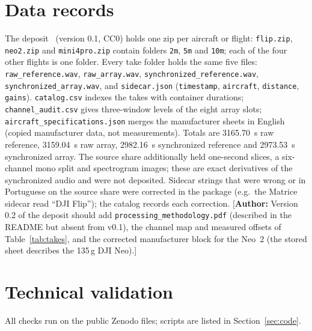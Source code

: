\documentclass[journal]{IEEEtran}
\newif\ifshowauthornotes\showauthornotestrue
\newcommand{\authornote}[1]{\ifshowauthornotes{\color{red!70!black}[\textbf{Author:} #1]}\fi}
\begin{document}
\section{Data records}\label{sec:records}
The deposit~\cite{ciodata} (version 0.1, CC0) holds one zip per aircraft or flight: \texttt{flip.zip}, \texttt{neo2.zip} and \texttt{mini4pro.zip} contain folders \texttt{2m}, \texttt{5m} and \texttt{10m}; each of the four other flights is one folder.
Every take folder holds the same five files: \texttt{raw\_reference.wav}, \texttt{raw\_array.wav}, \texttt{synchronized\_reference.wav}, \texttt{synchronized\_array.wav}, and \texttt{sidecar.json} (\texttt{timestamp}, \texttt{aircraft}, \texttt{distance}, \texttt{gains}).
\texttt{catalog.csv} indexes the takes with container durations; \texttt{channel\_audit.csv} gives three-window levels of the eight array slots; \texttt{aircraft\_specifications.json} merges the manufacturer sheets in English (copied manufacturer data, not measurements).
Totals are \SI{3165.70}{\second} raw reference, \SI{3159.04}{\second} raw array, \SI{2982.16}{\second} synchronized reference and \SI{2973.53}{\second} synchronized array.
The source share additionally held one-second slices, a six-channel mono split and spectrogram images; these are exact derivatives of the synchronized audio and were not deposited.
Sidecar strings that were wrong or in Portuguese on the source share were corrected in the package (e.g.\ the Matrice sidecar read ``DJI Flip''); the catalog records each correction.
\authornote{Version 0.2 of the deposit should add \texttt{processing\_methodology.pdf} (described in the README but absent from v0.1), the channel map and measured offsets of Table~\ref{tab:takes}, and the corrected manufacturer block for the Neo~2 (the stored sheet describes the 135\,g DJI Neo).}

\section{Technical validation}\label{sec:validation}
All checks run on the public Zenodo files; scripts are listed in Section~\ref{sec:code}.
\end{document}
